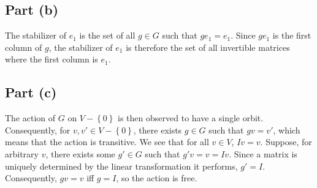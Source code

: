 \documentclass{article}
\begin{document}
\subsection*{Part (b)}
The stabilizer of $e_1$ is the set of all $g \in G$ such that $ge_1 = e_1$. Since $ge_1$ is the first column of $g$, the stabilizer of $e_1$ is therefore the set of all invertible matrices where the first column is $e_1$.
\subsection*{Part (c)}
The action of $G$ on $V - \left\{0\right\}$ is then observed to have a single orbit. Consequently, for $v, v' \in V - \left\{0\right\}$, there exists $g \in G$ such that $gv = v'$, which means that the action is transitive. We see that for all $v \in V$, $Iv = v$. Suppose, for arbitrary $v$, there exists some $g' \in G$ such that $g'v = v = Iv$. Since a matrix is uniquely determined by the linear transformation it performs, $g' = I$. Consequently, $gv = v$ iff $g = I$, so the action is free.
\end{document}
